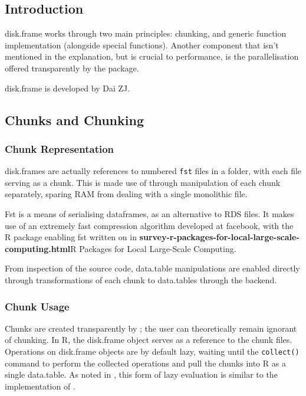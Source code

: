 \subsection{Introduction}\label{sec:disk-frame-introduction}

disk.frame works through two main principles: chunking, and generic
function implementation (alongside special functions). Another component
that isn't mentioned in the explanation, but is crucial to performance,
is the parallelisation offered transparently by the package.

disk.frame is developed by Dai ZJ.

\hypertarget{sec:chunking}{%
    \subsection{Chunks and Chunking}\label{sec:chunking}}

\hypertarget{sec:chunk-representation}{%
    \subsubsection{Chunk Representation}\label{sec:chunk-representation}}

disk.frames are actually references to numbered \texttt{fst} files in a
folder, with each file serving as a chunk. This is made use of through
manipulation of each chunk separately, sparing RAM from dealing with a
single monolithic file\cite{zj19:_inges_data}.

Fst is a means of serialising dataframes, as an alternative to RDS
files\cite{klik19}. It makes use of an extremely fast compression
algorithm developed at facebook, with the R package enabling fst written
on in \textbf{survey-r-packages-for-local-large-scale-computing.html}{R
    Packages for Local Large-Scale Computing}.

From inspection of the source code, data.table manipulations are enabled
directly through transformations of each chunk to data.tables through
the  backend.

\hypertarget{sec:making-chunks}{%
    \subsubsection{Chunk Usage}\label{sec:making-chunks}}

Chunks are created transparently by ; the user can
theoretically remain ignorant of chunking. In R, the disk.frame object
serves as a reference to the chunk files. Operations on disk.frame
objects are by default lazy, waiting until the
\texttt{collect()} command to perform the
collected operations and pull the chunks into R as a single data.table.
As noted in \cite{zj19:_simpl_verbs_lazy_evaluat}, this form of lazy
evaluation is similar to the implementation of .

